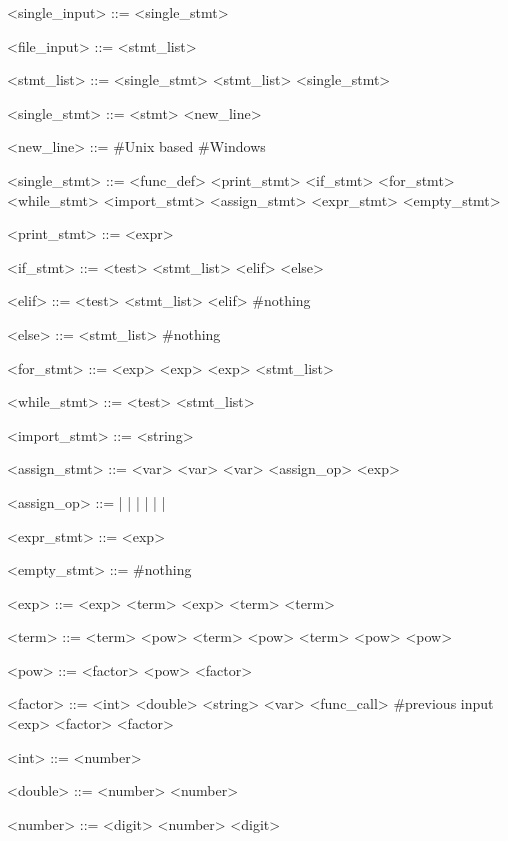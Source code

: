 \documentclass[fleqn,a4paper,11pt]{jsarticle}
\begin{document}
\begin{grammar}
<single_input> ::= <single_stmt>

<file_input> ::= <stmt_list>

<stmt_list> ::= <single_stmt> <stmt_list>
\alt <single_stmt>

<single_stmt> ::= <stmt> <new_line>

<new_line> ::=  \#Unix based
\alt {} \#Windows

<single_stmt> ::= <func_def>
\alt <print_stmt>
\alt <if_stmt>
\alt <for_stmt>
\alt <while_stmt>
\alt <import_stmt>
\alt <assign_stmt>
\alt <expr_stmt>
\alt <empty_stmt>

<print_stmt> ::=  \lit{(} <expr> \lit{)}

<if_stmt> ::=  <test> \lit{:} <stmt_list> <elif> <else>

<elif> ::=  <test> \lit{:} <stmt_list> <elif>
\alt \#nothing

<else> ::=  \lit{:} <stmt_list>
\alt \#nothing

<for_stmt> ::=  <exp>  <exp>  <exp> \lit{:} <stmt_list>

<while_stmt> ::=  <test> \lit{:} <stmt_list>

<import_stmt> ::=  <string>

<assign_stmt> ::= <var> \lit{++}
\alt <var> \lit{--} 
\alt <var> <assign_op> <exp>

<assign_op> ::= \lit{=} | \lit{+=} | \lit{-=} | \lit{*=} | \lit{/=} | \lit{\%=} | \lit{\^{}=}

<expr_stmt> ::= <exp>

<empty_stmt> ::= \#nothing

<exp> ::= <exp> \lit{+} <term>
\alt <exp> \lit{-} <term>
\alt <term>

<term> ::= <term> \lit{*} <pow>
\alt <term> \lit{/} <pow>
\alt <term> \lit{\%} <pow>
\alt <pow>

<pow> ::= <factor> \lit{\^{}} <pow>
\alt <factor>

<factor> ::= <int>
\alt <double>
\alt <string>
\alt <var>
\alt <func_call>
\alt \lit{\$} \#previous input
\alt \lit{(} <exp> \lit{)}
\alt \lit{+} <factor>
\alt \lit{-} <factor>

<int> ::= <number>

<double> ::= <number>  <number>

<number> ::= <digit> <number>
\alt <digit>


\end{grammar}
\end{document}
